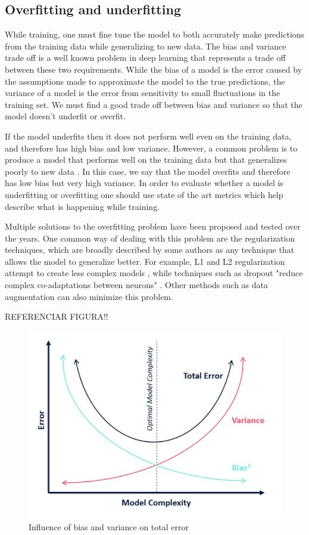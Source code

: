 \subsection{Overfitting and underfitting}
    While training, one must fine tune the model to both accurately make predictions from the training data while generalizing to new data. The bias and variance trade off is a well known problem in deep learning that represents a trade off between these two requirements. While the bias of a model is the error caused by the assumptions made to approximate the model to the true predictions, the variance of a model is the error from sensitivity to small fluctuations in the training set. We must find a good trade off between bias and variance so that the model doesn't underfit or overfit. \par
    If the model underfits then it does not perform well even on the training data, and therefore has high bias and low variance. However, a common problem is to produce a model that performs well on the training data but that generalizes poorly to new data \cite{Grus}. In this case, we say that the model overfits and therefore has low bias but very high variance. In order to evaluate whether a model is underfitting or overfitting one should use state of the art metrics which help describe what is happening while training. \par  
    Multiple solutions to the overfitting problem have been proposed and tested over the years. One common way of dealing with this problem are the regularization techniques, which are broadly described by some authors as any technique that allows the model to generalize better. For example, L1 and L2 regularization attempt to create less complex models \cite{Ng}, while techniques such as dropout "reduce complex co-adaptations between neurons" \cite{Hinton2012}. Other methods such as data augmentation can also minimize this problem.
    
    REFERENCIAR FIGURA!!
    \begin{figure}[ht]
      \centering
        \includegraphics[width=0.5\linewidth]{figs/bias_variance_tradeoff.png}
      \caption{Influence of bias and variance on total error}
      \label{fig:biasvariancetradeoff}
    \end{figure}

